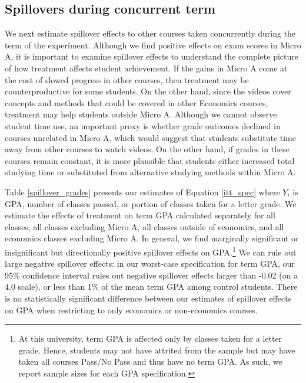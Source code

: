 \documentclass[12pt]{article}
\begin{document}
\subsection{Spillovers during concurrent term}

We next estimate spillover effects to other courses taken concurrently during the term of the experiment. Although we find positive effects on exam scores in Micro A, it is important to examine spillover effects to understand the complete picture of how treatment affects student achievement. If the gains in Micro A come at the cost of slowed progress in other courses, then treatment may be counterproductive for some students. On the other hand, since the videos cover concepts and methods that could be covered in other Economics courses, treatment may help students outside Micro A. Although we cannot observe student time use, an important proxy is whether grade outcomes declined in courses unrelated in Micro A, which would suggest that students substitute time away from other courses to watch videos. On the other hand, if grades in these courses remain constant, it is more plausible that students either increased total studying time or substituted from alternative studying methods within Micro A.

Table \ref{spillover_grades} presents our estimates of Equation \ref{itt_spec} where $Y_i$ is GPA, number of classes passed, or portion of classes taken for a letter grade. We estimate the effects of treatment on term GPA calculated separately for all classes, all classes excluding Micro A, all classes outside of economics, and all economics classes excluding Micro A. In general, we find marginally significant or insignificant but directionally positive spillover effects on GPA.\footnote{At this university, term GPA is affected only by classes taken for a letter grade. Hence, students may not have attrited from the sample but may have taken all courses Pass/No Pass and thus have no term GPA. As such, we report sample sizes for each GPA specification.} We can rule out large negative spillover effects: in our worst-case specification for term GPA, our 95\% confidence interval rules out negative spillover effects larger than -0.02 (on a 4.0 scale), or less than 1\% of the mean term GPA among control students. There is no statistically significant difference between our estimates of spillover effects on GPA when restricting to only economics or non-economics courses.
\end{document}
